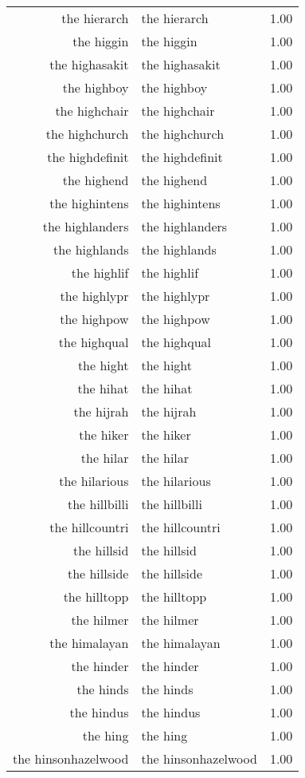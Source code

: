 \begin{table}[ht]
\begin{tabular}{rlr}
  the hierarch & the hierarch & 1.00 \\ 
  the higgin & the higgin & 1.00 \\ 
  the highasakit & the highasakit & 1.00 \\ 
  the highboy & the highboy & 1.00 \\ 
  the highchair & the highchair & 1.00 \\ 
  the highchurch & the highchurch & 1.00 \\ 
  the highdefinit & the highdefinit & 1.00 \\ 
  the highend & the highend & 1.00 \\ 
  the highintens & the highintens & 1.00 \\ 
  the highlanders & the highlanders & 1.00 \\ 
  the highlands & the highlands & 1.00 \\ 
  the highlif & the highlif & 1.00 \\ 
  the highlypr & the highlypr & 1.00 \\ 
  the highpow & the highpow & 1.00 \\ 
  the highqual & the highqual & 1.00 \\ 
  the hight & the hight & 1.00 \\ 
  the hihat & the hihat & 1.00 \\ 
  the hijrah & the hijrah & 1.00 \\ 
  the hiker & the hiker & 1.00 \\ 
  the hilar & the hilar & 1.00 \\ 
  the hilarious & the hilarious & 1.00 \\ 
  the hillbilli & the hillbilli & 1.00 \\ 
  the hillcountri & the hillcountri & 1.00 \\ 
  the hillsid & the hillsid & 1.00 \\ 
  the hillside & the hillside & 1.00 \\ 
  the hilltopp & the hilltopp & 1.00 \\ 
  the hilmer & the hilmer & 1.00 \\ 
  the himalayan & the himalayan & 1.00 \\ 
  the hinder & the hinder & 1.00 \\ 
  the hinds & the hinds & 1.00 \\ 
  the hindus & the hindus & 1.00 \\ 
  the hing & the hing & 1.00 \\ 
  the hinsonhazelwood & the hinsonhazelwood & 1.00 \\ 

\end{tabular}
\end{table}
